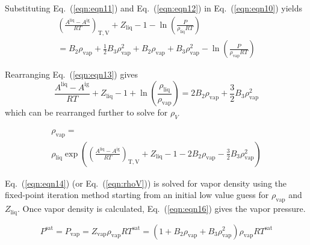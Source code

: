 \documentclass[5p,times]{elsarticle}
\begin{document}
Substituting Eq.~(\ref{eqn:eqn11}) and Eq.~(\ref{eqn:eqn12}) in Eq.~(\ref{eqn:eqn10}) yields
\begin{equation}
\begin{array}{l}{\left( {\frac{{{A^{\mathrm{liq}}} - {A^{\mathrm{ig}}}}}{{RT}}} \right)_{\mathrm{T,V}}} + {Z_{\mathrm{liq}}} - 1 - \ln \left( \frac{P}{{{\rho _{\mathrm{liq}}}RT}} \right) \\ = {B_2}{\rho _{\mathrm{vap}}} +
\frac{1}{2}{B_3}\rho _{\mathrm{vap}}^2 + {B_2}{\rho _{\mathrm{vap}}} + {B_3}\rho _{\mathrm{vap}}^2 - \ln \left( \frac{P}{{{\rho _{\mathrm{vap}}}RT}} \right) \end{array}
 \label{eqn:eqn13}
\end{equation}

Rearranging Eq.~(\ref{eqn:eqn13}) gives
\begin{equation}
\frac{{{A^{\mathrm{liq}}} - {A^{\mathrm{ig}}}}}{{RT}} + {Z_{\mathrm{liq}}} - 1 + \ln \left( \frac{{{\rho _{\mathrm{liq}}}}}{{{\rho _{\mathrm{vap}}}}} \right) = 2{B_2} {\rho _{\mathrm{vap}}} + \frac{3}{2}{B_3} \rho _{\mathrm{vap}}^2 \label{eqn:eqn14}
\end{equation}
which can be rearranged further to solve for ${\rho _V}$

\begin{equation}
\begin{array}{l}
{\rho _{\mathrm{vap}} = }
\\ 
{{\rho _{\mathrm{liq}}}\exp \left( {{{\left( {\frac{{{A^{\mathrm{liq}}} - {A^{\mathrm{ig}}}}}{{RT}}} \right)}_{\mathrm{T,V}}} + {Z_{\mathrm{liq}}} - 1 - 2{B_2} {\rho _{\mathrm{vap}}} - \frac{3}{2}{B_3} \rho _{\mathrm{vap}}^2}
\right) }  
\end{array}
\label{eqn:rhoV}
\end{equation}

Eq.~(\ref{eqn:eqn14}) (or Eq.~(\ref{eqn:rhoV})) is solved for vapor density using the fixed-point iteration method \cite{Burden1985} starting from an initial low value guess for $\rho_\mathrm{vap}$ and $Z_\mathrm{liq}$. Once vapor density is calculated, Eq.~(\ref{eqn:eqn16}) gives the vapor pressure.

\begin{equation}
P^\mathrm{sat} = P_\mathrm{vap} = {Z_\mathrm{vap}}{\rho _\mathrm{vap}}RT^\mathrm{sat} = (1 + {B_2} {\rho_\mathrm{vap}} + {B_3}\rho _\mathrm{vap}^2){\rho _\mathrm{vap}}RT^\mathrm{sat} 
\label{eqn:eqn16}
\end{equation}
\end{document}
